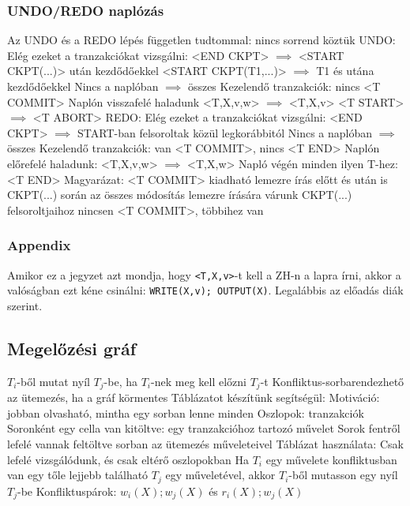 \documentclass[12pt,a4paper]{article}
\begin{document}
\pagebreak

\subsubsection{UNDO/REDO naplózás}

\begin{outline}
	\1 Az UNDO és a REDO lépés független tudtommal: nincs sorrend köztük
	\1 UNDO:
		\2 Elég ezeket a tranzakciókat vizsgálni:
			\3 <END CKPT> $\implies$ <START CKPT(...)> után kezdődőekkel
			\3 <START CKPT(T1,...)> $\implies$ T1 és utána kezdődőekkel
			\3 Nincs a naplóban $\implies$ összes
		\2 Kezelendő tranzakciók: nincs <T COMMIT>
		\2 Naplón visszafelé haladunk
			\3 <T,X,v,w> $\implies$ <T,X,v>
			\3 <T START> $\implies$ <T ABORT>
	\1 REDO:
		\2 Elég ezeket a tranzakciókat vizsgálni:
			\3 <END CKPT> $\implies$ START-ban felsoroltak közül legkorábbitól
			\3 Nincs a naplóban $\implies$ összes
		\2 Kezelendő tranzakciók: van <T COMMIT>, nincs <T END>
		\2 Naplón előrefelé haladunk:
			\3 <T,X,v,w> $\implies$ <T,X,w>
		\2 Napló végén minden ilyen T-hez: <T END>
	\1 Magyarázat:
		\2 <T COMMIT> kiadható lemezre írás előtt és után is
		\2 CKPT(...) során az összes módosítás lemezre írására várunk
		\2 CKPT(...) felsoroltjaihoz nincsen <T COMMIT>, többihez van
\end{outline}

\subsubsection{Appendix}

Amikor ez a jegyzet azt mondja, hogy \texttt{<T,X,v>}-t kell a ZH-n a lapra írni, akkor a valóságban ezt kéne csinálni: \texttt{WRITE(X,v); OUTPUT(X)}. Legalábbis az előadás diák szerint.

\pagebreak

\subsection{Megelőzési gráf}

\begin{outline}
	\1 $T_i$-ből mutat nyíl $T_j$-be, ha $T_i$-nek meg kell előzni $T_j$-t
		\2 Konfliktus-sorbarendezhető az ütemezés, ha a gráf körmentes
	\1 Táblázatot készítünk segítségül:
		\2 Motiváció: jobban olvasható, mintha egy sorban lenne minden
		\2 Oszlopok: tranzakciók
		\2 Soronként egy cella van kitöltve: egy tranzakcióhoz tartozó művelet
		\2 Sorok fentről lefelé vannak feltöltve sorban az ütemezés műveleteivel
	\1 Táblázat használata:
		\2 Csak lefelé vizsgálódunk, és csak eltérő oszlopokban
		\2 Ha $T_i$ egy művelete konfliktusban van egy tőle lejjebb található $T_j$ egy műveletével, akkor $T_i$-ből mutasson egy nyíl $T_j$-be
	\1 Konfliktuspárok: $w_i(X);w_j(X)$ és $r_i(X);w_j(X)$
\end{outline}
\end{document}
